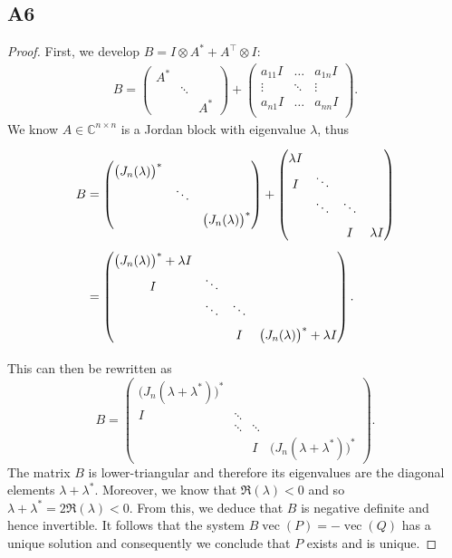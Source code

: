 \documentclass[11pt]{article}
\newcommand{\kp}{\otimes}
\DeclareMathOperator{\vect}{vec}
\newcommand{\complex}{\mathbb{C}} %
\begin{document}
\subsection*{A6}
\begin{proof}
First, we develop $B=I\kp A^*+A^\top\kp I$:
\begin{align*}
    B=
    \begin{pmatrix}
    A^* & & \\
    &\ddots&\\
    & & A^*
    \end{pmatrix}+
    \begin{pmatrix}
    a_{11} I & \dots & a_{1n} I\\
    \vdots & \ddots & \vdots\\
    a_{n1} I & \dots & a_{nn} I\\
    \end{pmatrix}.
\end{align*}
We know $A\in\complex^{n\times n}$ is a Jordan block with eigenvalue $\lambda$, thus
\begin{align*}
    B&=
    \renewcommand{\arraystretch}{1.5}
    \begin{pmatrix}
    \big(J_n(\lambda)\big)^* & & \\
    &\ddots&\\
    & & \big(J_n(\lambda)\big)^*
    \end{pmatrix}+
    \begin{pmatrix}
    \lambda I & & &\\
    I & \ddots & &\\
    & \ddots & \ddots &\\
    & & I & \lambda I
    \end{pmatrix}\\
    &=\begin{pmatrix}
    \big(J_n(\lambda)\big)^*+\lambda I &  &  & \\
    I & \ddots & &\\
    & \ddots & \ddots &\\
    & & I & \big(J_n(\lambda)\big)^*+\lambda I
    \end{pmatrix}.
\end{align*}

This can then be rewritten as
\[
    B =\begin{pmatrix}
    \big(J_n(\lambda+\lambda^*)\big)^* & & & \\
    I & \ddots & &\\
    & \ddots & \ddots &\\
    & & I & \big(J_n(\lambda+\lambda^*)\big)^*
    \end{pmatrix}.
\]
The matrix \(B\) is lower-triangular and therefore its eigenvalues are the diagonal elements $\lambda+\lambda^*$.
Moreover, we know that $\Re(\lambda)<0$ and so $\lambda+\lambda^*=2 \Re(\lambda)<0$.
From this, we deduce that $B$ is negative definite and hence invertible.
It follows that the system $B\vect(P)=-\vect(Q)$ has a unique solution and consequently we conclude that \(P\) exists and is unique.
\end{proof}
\end{document}
